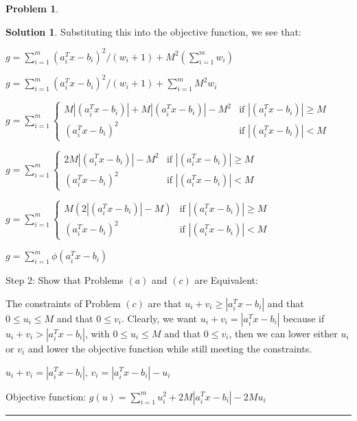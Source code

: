 \documentclass{article}
\theoremstyle{definition}
\newtheorem{problem}{Problem}
\def\fline{\rule{0.75\linewidth}{0.5pt}}
\newcommand{\finishline}{\begin{center}\fline\end{center}}
\newtheorem*{solution*}{Solution}
\newenvironment{solution}{\begin{solution*}}{{\finishline} \end{solution*}}
\begin{document}
\begin{problem}
\begin{solution}
Substituting this into the objective function, we see that: \newline 

$g = \sum_{i=1}^{m} (a_i^T x - b_i)^2/(w_i + 1) + M^2(\sum_{i=1}^{m} w_i)$ \newline 

$g = \sum_{i=1}^{m} (a_i^T x - b_i)^2/(w_i + 1) + \sum_{i=1}^{m} M^2 w_i$ \newline 

$g = \sum_{i=1}^{m} \begin{cases} 
      M|(a_i^T x - b_i)| + M|(a_i^T x - b_i)| - M^2  & \text{if }  |(a_i^T x - b_i)| \geq M \\
      (a_i^T x - b_i)^2 & \text{if } |(a_i^T x - b_i)| < M
   \end{cases}$ \newline 

$g = \sum_{i=1}^{m} \begin{cases} 
      2M|(a_i^T x - b_i)| - M^2  & \text{if }  |(a_i^T x - b_i)| \geq M \\
      (a_i^T x - b_i)^2 & \text{if } |(a_i^T x - b_i)| < M
   \end{cases}$ \newline 

$g = \sum_{i=1}^{m} \begin{cases} 
      M(2|(a_i^T x - b_i)| - M)  & \text{if }  |(a_i^T x - b_i)| \geq M \\
      (a_i^T x - b_i)^2 & \text{if } |(a_i^T x - b_i)| < M
   \end{cases}$ \newline 

$g = \sum_{i=1}^{m} \phi(a_i^T x - b_i)$ \newline 

Step 2: Show that Problems $(a)$ and $(c)$ are Equivalent: \newline 

    The constraints of Problem $(c)$ are that $u_i + v_i \geq |a_i^T x - b_i|$ and that $0 \leq u_i \leq M$ and that $0 \leq v_i$. Clearly, we want $u_i + v_i = |a_i^T x - b_i|$ because if $u_i + v_i > |a_i^T x - b_i|$, with $0 \leq u_i \leq M$ and that $0 \leq v_i$, then we can lower either $u_i$ or $v_i$ and lower the objective function while still meeting the constraints. 

    $u_i + v_i = |a_i^T x - b_i|$, $v_i = |a_i^T x - b_i| - u_i$

    Objective function: $g(u) = \sum_{i=1}^{m} u_i^2 + 2M|a_i^T x - b_i| - 2Mu_i$


\end{solution}
\end{problem}
\end{document}
